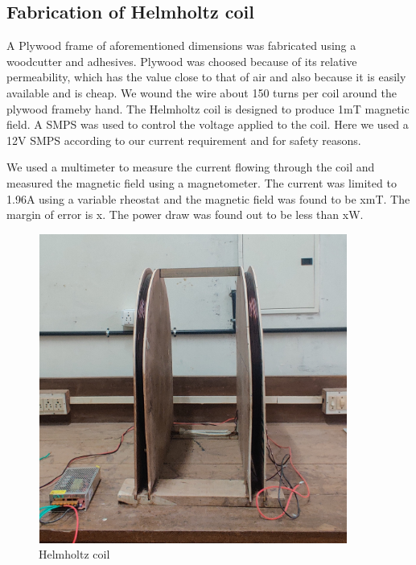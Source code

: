 \subsection{Fabrication of Helmholtz coil}

A Plywood frame of aforementioned dimensions was fabricated using a woodcutter and adhesives. Plywood was choosed because of its relative permeability, which has the value close to that of air and also because it is easily available and is cheap. We wound the wire about 150 turns per coil around the plywood frameby hand. The Helmholtz coil is designed to produce 1mT magnetic field. A SMPS was used to control the voltage applied to the coil. Here we used a 12V SMPS according to our current requirement and for safety reasons.

We used a multimeter to measure the current flowing through the coil and measured the magnetic field using a magnetometer. The current was limited to 1.96A using a variable rheostat and the magnetic field was found to be xmT. The margin of error is x. The power draw was found out to be less than xW.

\vspace{10pt}
\begin{figure}[h!]
	\centering
	\includegraphics[width=4in,height=4in]{images/1pic.jpg}
	\caption{Helmholtz coil}
	\label{fig-wVt}
\end{figure}
